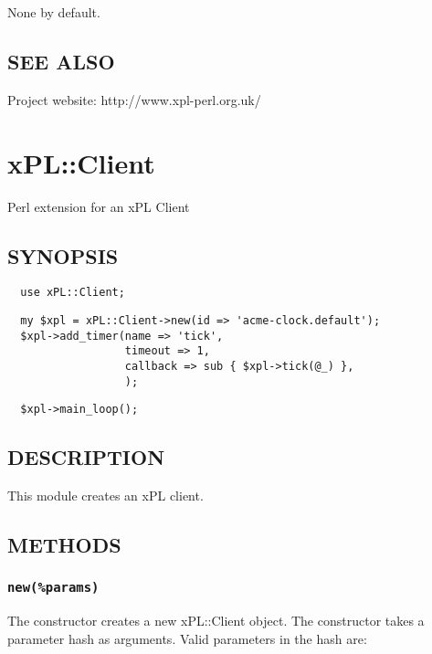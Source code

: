 None by default.

\subsection*{SEE ALSO\label{xPL::Bridge_SEE_ALSO}}


Project website: http://www.xpl-perl.org.uk/

\section{xPL::Client\label{xPL::Client}}


Perl extension for an xPL Client

\subsection*{SYNOPSIS\label{xPL::Client_SYNOPSIS}}
\begin{verbatim}
  use xPL::Client;
\end{verbatim}
\begin{verbatim}
  my $xpl = xPL::Client->new(id => 'acme-clock.default');
  $xpl->add_timer(name => 'tick',
                  timeout => 1,
                  callback => sub { $xpl->tick(@_) },
                  );
\end{verbatim}
\begin{verbatim}
  $xpl->main_loop();
\end{verbatim}
\subsection*{DESCRIPTION\label{xPL::Client_DESCRIPTION}}


This module creates an xPL client.

\subsection*{METHODS\label{xPL::Client_METHODS}}
\subsubsection*{\texttt{new(\%params)}\label{xPL::Client_new_params_}}


The constructor creates a new xPL::Client object.  The constructor
takes a parameter hash as arguments.  Valid parameters in the hash
are:

